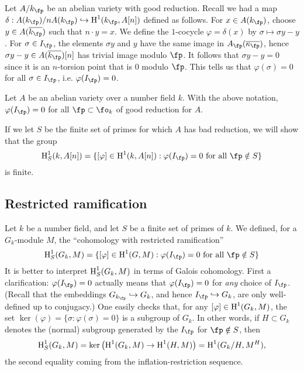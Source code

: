 Let $A/k_\fp$ be an abelian variety with good reduction. Recall we had a map 
$\delta:A(k_\fp)/n A(k_\fp) \hookrightarrow \h^1(k_\fp,A[n])$ defined as 
follows. For $x\in A(k_\fp)$, choose $y\in A(\overline{k_\fp})$ such that 
$n\cdot y=x$. We define the $1$-cocycle $\varphi=\delta(x)$ by 
$\sigma\mapsto \sigma y - y$. For $\sigma\in I_\fp$, the elements 
$\sigma y$ and $y$ have the same image in $A_\fp(\overline{\kappa_\fp})$, hence  
$\sigma y - y\in A(\overline{k_\fp})[n]$ has trivial image modulo $\fp$. It 
follows that $\sigma y-y=0$ since it is an $n$-torsion point that is $0$ 
modulo $\fp$. This tells us that $\varphi(\sigma) = 0$ for all 
$\sigma\in I_\fp$, i.e. $\varphi(I_\fp) = 0$. 

\begin{lemma}
Let $A$ be an abelian variety over a number field $k$. With the above notation, 
$\varphi(I_\fp) = 0$ for all $\fp\subset \fo_k$ of good reduction for $A$. 
\end{lemma}

If we let $S$ be the finite set of primes for which $A$ has bad reduction, we 
will show that the group
\[
  \h_S^1(k,A[n]) = \{[\varphi]\in \h^1(k,A[n]) : \varphi(I_\fp) = 0\text{ for all } \fp\notin S\}
\]
is finite. 















\subsection{Restricted ramification}\label{sec:res-ram}

Let $k$ be a number field, and let $S$ be a finite set of primes of $k$. We 
defined, for a $G_k$-module $M$, the ``cohomology with restricted 
ramification'' 
\[
  \h_S^1(G_k,M) = \{[\varphi]\in \h^1(G,M) : \varphi(I_\fp) = 0\text{ for all }\fp\notin S\}
\]
It is better to interpret $\operatorname{H}_S^1(G_k,M)$ in terms of Galois cohomology. First 
a clarification: $\varphi(I_\fp)=0$ actually means that $\varphi(I_\fp)=0$ for 
\emph{any} choice of $I_\fp$. (Recall that the embeddings 
$G_{k_\fp}\hookrightarrow G_k$, and hence $I_\fp\hookrightarrow G_k$, are only 
well-defined up to conjugacy.) One easily checks that, for any 
$[\varphi]\in \operatorname{H}^1(G_k,M)$, the set 
$\ker(\varphi)=\{\sigma:\varphi(\sigma)=0\}$ is a subgroup of $G_k$. In other 
words, if $H\subset G_k$ denotes the (normal) subgroup generated by the 
$I_\fp$ for $\fp\notin S$, then 
\[
  \operatorname{H}_S^1(G_k,M) = \ker\left(\operatorname{H}^1(G_k,M) \to \operatorname{H}^1(H,M)\right) 
                = \operatorname{H}^1(G_k/H,M^H) \text{,}
\]
the second equality coming from the inflation-restriction sequence. 

